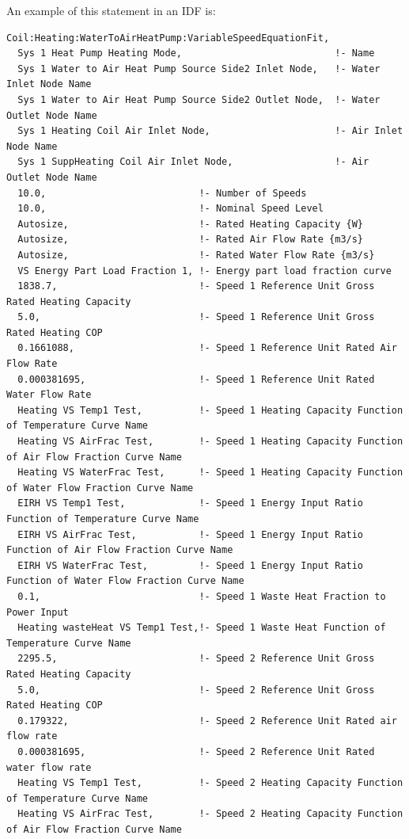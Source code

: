 An example of this statement in an IDF is:

\begin{lstlisting}
Coil:Heating:WaterToAirHeatPump:VariableSpeedEquationFit,
  Sys 1 Heat Pump Heating Mode,                           !- Name
  Sys 1 Water to Air Heat Pump Source Side2 Inlet Node,   !- Water Inlet Node Name
  Sys 1 Water to Air Heat Pump Source Side2 Outlet Node,  !- Water Outlet Node Name
  Sys 1 Heating Coil Air Inlet Node,                      !- Air Inlet Node Name
  Sys 1 SuppHeating Coil Air Inlet Node,                  !- Air Outlet Node Name
  10.0,                           !- Number of Speeds
  10.0,                           !- Nominal Speed Level
  Autosize,                       !- Rated Heating Capacity {W}
  Autosize,                       !- Rated Air Flow Rate {m3/s}
  Autosize,                       !- Rated Water Flow Rate {m3/s}
  VS Energy Part Load Fraction 1, !- Energy part load fraction curve
  1838.7,                         !- Speed 1 Reference Unit Gross Rated Heating Capacity
  5.0,                            !- Speed 1 Reference Unit Gross Rated Heating COP
  0.1661088,                      !- Speed 1 Reference Unit Rated Air Flow Rate
  0.000381695,                    !- Speed 1 Reference Unit Rated Water Flow Rate
  Heating VS Temp1 Test,          !- Speed 1 Heating Capacity Function of Temperature Curve Name
  Heating VS AirFrac Test,        !- Speed 1 Heating Capacity Function of Air Flow Fraction Curve Name
  Heating VS WaterFrac Test,      !- Speed 1 Heating Capacity Function of Water Flow Fraction Curve Name
  EIRH VS Temp1 Test,             !- Speed 1 Energy Input Ratio Function of Temperature Curve Name
  EIRH VS AirFrac Test,           !- Speed 1 Energy Input Ratio Function of Air Flow Fraction Curve Name
  EIRH VS WaterFrac Test,         !- Speed 1 Energy Input Ratio Function of Water Flow Fraction Curve Name
  0.1,                            !- Speed 1 Waste Heat Fraction to Power Input
  Heating wasteHeat VS Temp1 Test,!- Speed 1 Waste Heat Function of Temperature Curve Name
  2295.5,                         !- Speed 2 Reference Unit Gross Rated Heating Capacity
  5.0,                            !- Speed 2 Reference Unit Gross Rated Heating COP
  0.179322,                       !- Speed 2 Reference Unit Rated air flow rate
  0.000381695,                    !- Speed 2 Reference Unit Rated water flow rate
  Heating VS Temp1 Test,          !- Speed 2 Heating Capacity Function of Temperature Curve Name
  Heating VS AirFrac Test,        !- Speed 2 Heating Capacity Function of Air Flow Fraction Curve Name

\end{lstlisting}
